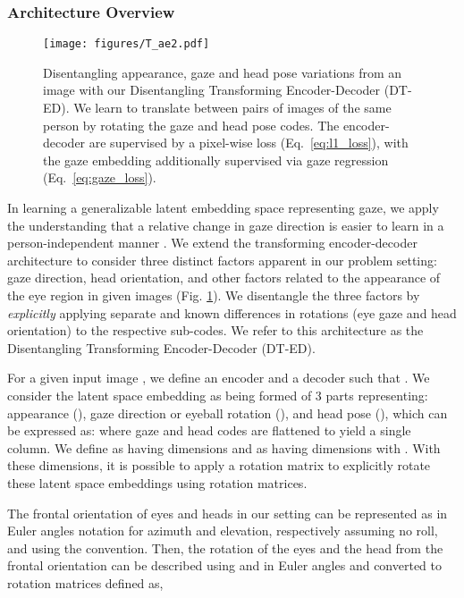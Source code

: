 \documentclass[10pt,twocolumn,letterpaper]{article}
\begin{document}
\subsubsection{Architecture Overview}
\begin{figure}
    \centering
    \vskip -0.5mm
    \texttt{[image: figures/T\_ae2.pdf]}
    \vskip -5.5mm
    \caption{Disentangling appearance, gaze and head pose variations from an image with our Disentangling Transforming Encoder-Decoder (DT-ED). We learn to translate between pairs of images of the same person by rotating the gaze and head pose codes. The encoder-decoder are supervised by a pixel-wise  loss (Eq.~\ref{eq:l1_loss}), with the gaze embedding additionally supervised via gaze regression (Eq.~\ref{eq:gaze_loss}).}
    \label{fig:t_ae}
    \vspace*{-2mm}
\end{figure}
In learning a generalizable latent embedding space representing gaze, we apply the understanding that a relative change in gaze direction is easier to learn in a person-independent manner \cite{Liu2018BMVC}.
We extend the transforming encoder-decoder architecture \cite{Hinton2011ICANN,Worrall2017ICCV} to consider three distinct factors apparent in our problem setting: gaze direction, head orientation, and other factors related to the appearance of the eye region in given images (Fig. \ref{fig:t_ae}). 
We disentangle the three factors by \emph{explicitly} applying separate and known differences in rotations (eye gaze and head orientation) to the respective sub-codes.
We refer to this architecture as the Disentangling Transforming Encoder-Decoder (DT-ED).



For a given input image 
, we define an encoder  and a decoder  such that .
We consider the latent space embedding  as being formed of 3 parts representing: appearance (), gaze direction or eyeball rotation (), and head pose (), which can be expressed as:  where gaze and head codes are flattened to yield a single column.
We define  as having dimensions  and  as having dimensions  with .
With these dimensions, it is possible to apply a rotation matrix to explicitly rotate these  latent space embeddings using rotation matrices.

The frontal orientation of eyes and heads in our setting can be represented as 
 in Euler angles notation for azimuth and elevation, respectively assuming no roll, and using the  convention. Then, the rotation of the eyes and the head from the frontal orientation can be described using  and  in Euler angles and converted to rotation matrices defined as,
\end{document}
